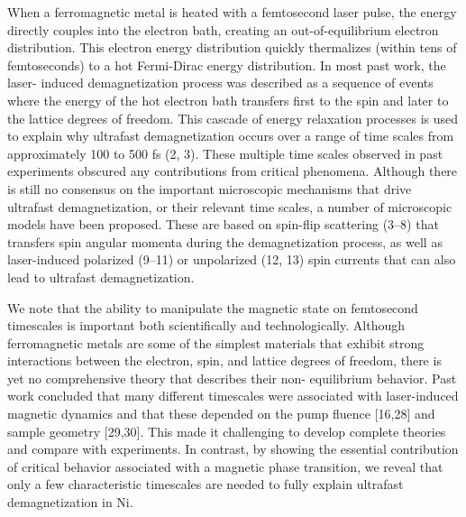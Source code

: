 When a ferromagnetic metal is heated with a femtosecond laser pulse, the energy directly couples into the electron bath, creating an out-of-equilibrium electron distribution. This electron energy distribution quickly thermalizes (within tens of femtoseconds) to a hot Fermi-Dirac energy distribution. In most past work, the laser- induced demagnetization process was described as a sequence of events where the energy of the hot electron bath transfers first to the spin and later to the lattice degrees of freedom. This cascade of energy relaxation processes is used to explain why ultrafast demagnetization occurs over a range of time scales from approximately 100 to 500 fs (2, 3). These multiple time scales observed in past experiments obscured any contributions from critical phenomena. Although there is still no consensus on the important microscopic mechanisms that drive ultrafast demagnetization, or their relevant time scales, a number of microscopic models have been proposed. These are based on spin-flip scattering (3–8) that transfers spin angular momenta during the demagnetization process, as well as laser-induced polarized (9–11) or unpolarized (12, 13) spin currents that can also lead to ultrafast demagnetization.

We note that the ability to manipulate the magnetic state on femtosecond timescales is important both scientifically and technologically. Although ferromagnetic metals are some of the simplest materials that exhibit strong interactions between the electron, spin, and lattice degrees of freedom, there is yet no comprehensive theory that describes their non- equilibrium behavior. Past work concluded that many different timescales were associated with laser-induced magnetic dynamics and that these depended on the pump fluence [16,28] and sample geometry [29,30]. This made it challenging to develop complete theories and compare with experiments. In contrast, by showing the essential contribution of critical behavior associated with a magnetic phase transition, we reveal that only a few characteristic timescales are needed to fully explain ultrafast demagnetization in Ni.


